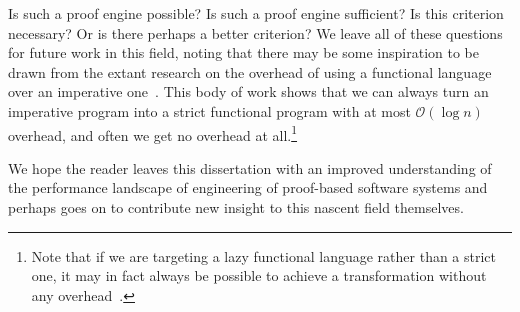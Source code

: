 Is such a proof engine possible?
Is such a proof engine sufficient?
Is this criterion necessary?
Or is there perhaps a better criterion?
We leave all of these questions for future work in this field, noting that there may be some inspiration to be drawn from the extant research on the overhead of using a functional language over an imperative one~\cite{Efficiency2010Campbell,Ben-AmramG92,Ben-amram96noteson,More1997Bird,okasaki1996purely,okasaki1998purely,Pure1997Pippenger}.
This body of work shows that we can always turn an imperative program into a strict functional program with at most $\mathcal O(\log n)$ overhead, and often we get no overhead at all.\footnote{%
  Note that if we are targeting a lazy functional language rather than a strict one, it may in fact always be possible to achieve a transformation without any overhead~\cite{Efficiency2010Campbell}.%
}

We hope the reader leaves this dissertation with an improved understanding of the performance landscape of engineering of proof-based software systems and perhaps goes on to contribute new insight to this nascent field themselves.
